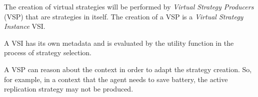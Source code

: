 The creation of virtual strategies will be performed by \textit{Virtual Strategy Producers} (VSP) that are strategies in itself. The creation of a VSP is a \textit{Virtual Strategy Instance} VSI.

A VSI has its own metadata and is evaluated by the utility function in the process of strategy selection.


 A VSP can reason about the context in order to adapt the strategy creation. So, for example, in a context that the agent needs to save battery, the active replication strategy may not be produced.
